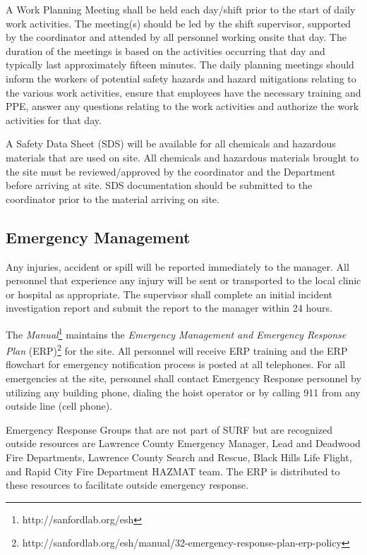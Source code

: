 A Work Planning Meeting shall be held each day/shift prior to the
start of daily work activities. The meeting(s) should be led by the
shift supervisor, supported by the   coordinator and
attended by all personnel working onsite that day. The duration of
the meetings is based on the activities occurring that day and
typically last approximately fifteen minutes. The daily planning
meetings should inform the workers of potential safety hazards and
hazard mitigations relating to the various work activities, ensure
that employees have the necessary  training and PPE, answer any
questions relating to the work activities and authorize the work
activities for that day.

A Safety Data Sheet (SDS) will be available for all chemicals and
hazardous materials that are used on site. All chemicals and hazardous
materials brought to the  site must be reviewed/approved by the
  coordinator and the  
Department before arriving at site.  SDS documentation should be
submitted to the   coordinator prior to the
material arriving on site.

\subsection{Emergency Management}

Any injuries, accident or spill will be reported immediately to the
  manager. All personnel that
experience any injury will be sent or transported to the local clinic
or hospital as appropriate.  The supervisor shall complete an initial
incident investigation report and submit the report to the
  manager within 24 hours.

The {\it {} 
Manual}\footnote{http://sanfordlab.org/esh} maintains the {\it Emergency
Management and Emergency Response Plan}
(ERP)\footnote{http://sanfordlab.org/esh/manual/32-emergency-response-plan-erp-policy}
for the site. All personnel will receive ERP training and the ERP
flowchart for emergency notification process is posted at all
telephones. For all emergencies at the  site, personnel
shall contact Emergency Response personnel by utilizing any building
phone, dialing the hoist operator or by calling 911 from any outside
line (cell phone).

Emergency Response Groups that are not part of SURF but are recognized
outside resources are Lawrence County Emergency Manager, Lead and
Deadwood Fire Departments, Lawrence County Search and Rescue, Black
Hills Life Flight, and Rapid City Fire Department HAZMAT team. The
 ERP is distributed to these resources to facilitate outside
emergency response.

